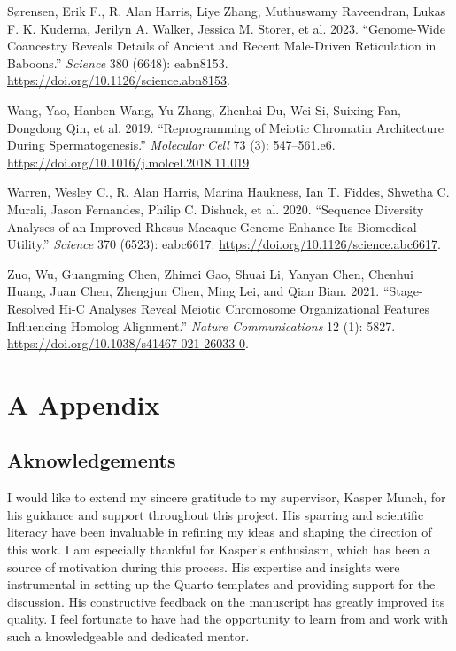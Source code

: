 \documentclass[
  11pt,
  a4paper,
]{scrbook}
\newlength{\cslhangindent}
\newenvironment{CSLReferences}[2] %
 {\begin{list}{}{%
  \setlength{\itemindent}{0pt}
  \setlength{\leftmargin}{0pt}
  \setlength{\parsep}{0pt}
  \ifodd #1
   \setlength{\leftmargin}{\cslhangindent}
   \setlength{\itemindent}{-1\cslhangindent}
  \fi
  \setlength{\itemsep}{#2\baselineskip}}}
 {\end{list}}
\let\oldemph\emph
\renewcommand\emph[1]{\oldemph{\color{gray}#1}}
\begin{document}
\begin{CSLReferences}{1}{0}
Sørensen, Erik F., R. Alan Harris, Liye Zhang, Muthuswamy Raveendran,
Lukas F. K. Kuderna, Jerilyn A. Walker, Jessica M. Storer, et al. 2023.
{``Genome-Wide Coancestry Reveals Details of Ancient and Recent
Male-Driven Reticulation in Baboons.''} \emph{Science} 380 (6648):
eabn8153. \url{https://doi.org/10.1126/science.abn8153}.

Wang, Yao, Hanben Wang, Yu Zhang, Zhenhai Du, Wei Si, Suixing Fan,
Dongdong Qin, et al. 2019. {``Reprogramming of {Meiotic Chromatin
Architecture} During {Spermatogenesis}.''} \emph{Molecular Cell} 73 (3):
547--561.e6. \url{https://doi.org/10.1016/j.molcel.2018.11.019}.

Warren, Wesley C., R. Alan Harris, Marina Haukness, Ian T. Fiddes,
Shwetha C. Murali, Jason Fernandes, Philip C. Dishuck, et al. 2020.
{``Sequence Diversity Analyses of an Improved Rhesus Macaque Genome
Enhance Its Biomedical Utility.''} \emph{Science} 370 (6523): eabc6617.
\url{https://doi.org/10.1126/science.abc6617}.

Zuo, Wu, Guangming Chen, Zhimei Gao, Shuai Li, Yanyan Chen, Chenhui
Huang, Juan Chen, Zhengjun Chen, Ming Lei, and Qian Bian. 2021.
{``Stage-Resolved {Hi-C} Analyses Reveal Meiotic Chromosome
Organizational Features Influencing Homolog Alignment.''} \emph{Nature
Communications} 12 (1): 5827.
\url{https://doi.org/10.1038/s41467-021-26033-0}.

\end{CSLReferences}

\endgroup

\chapter*{A Appendix}\label{a-appendix}

\section{Aknowledgements}\label{aknowledgements}

I would like to extend my sincere gratitude to my supervisor, Kasper
Munch, for his guidance and support throughout this project. His
sparring and scientific literacy have been invaluable in refining my
ideas and shaping the direction of this work. I am especially thankful
for Kasper's enthusiasm, which has been a source of motivation during
this process. His expertise and insights were instrumental in setting up
the Quarto templates and providing support for the discussion. His
constructive feedback on the manuscript has greatly improved its
quality. I feel fortunate to have had the opportunity to learn from and
work with such a knowledgeable and dedicated mentor.
\end{document}

